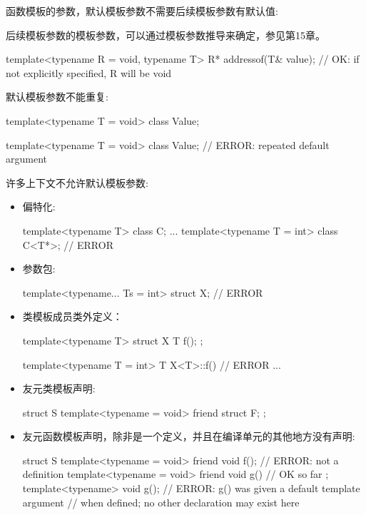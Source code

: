 函数模板的参数，默认模板参数不需要后续模板参数有默认值:

\begin{notice}
后续模板参数的模板参数，可以通过模板参数推导来确定，参见第15章。
\end{notice}

\begin{cpp}
template<typename R = void, typename T>
R* addressof(T& value); // OK: if not explicitly specified, R will be void
\end{cpp}

默认模板参数不能重复:

\begin{cpp}
template<typename T = void>
class Value;

template<typename T = void>
class Value; // ERROR: repeated default argument
\end{cpp}

许多上下文不允许默认模板参数:

\begin{itemize}
\item 
偏特化:

\begin{cpp}
template<typename T>
class C;
...
template<typename T = int>
class C<T*>; // ERROR
\end{cpp}

\item 
参数包:

\begin{cpp}
template<typename... Ts = int> struct X; // ERROR
\end{cpp}

\item 
类模板成员类外定义：

\begin{cpp}
template<typename T> struct X
{
	T f();
};

template<typename T = int> T X<T>::f() { // ERROR
	...
}
\end{cpp}

\item 
友元类模板声明:

\begin{cpp}
struct S {
	template<typename = void> friend struct F;
};
\end{cpp}

\item 
友元函数模板声明，除非是一个定义，并且在编译单元的其他地方没有声明:

\begin{cpp}
struct S {
	template<typename = void> friend void f(); // ERROR: not a definition
	template<typename = void> friend void g() { // OK so far
	}
};
template<typename> void g(); // ERROR: g() was given a default template argument
// when defined; no other declaration may exist here
\end{cpp}

\end{itemize}















